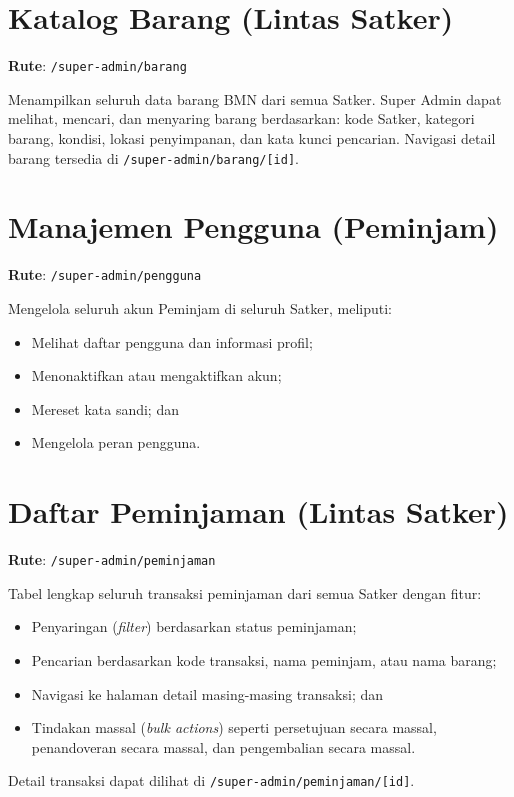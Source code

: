 \documentclass[
  12pt,
  a4paper,
  oneside,
  final
]{report}
\begin{document}
\section{Katalog Barang (Lintas Satker)}
\textbf{Rute}: \texttt{/super-admin/barang}

Menampilkan seluruh data barang BMN dari semua Satker. Super Admin
dapat melihat, mencari, dan menyaring barang berdasarkan:
kode Satker, kategori barang, kondisi, lokasi penyimpanan,
dan kata kunci pencarian. Navigasi detail barang tersedia di
\texttt{/super-admin/barang/[id]}.

\section{Manajemen Pengguna (Peminjam)}
\textbf{Rute}: \texttt{/super-admin/pengguna}

Mengelola seluruh akun Peminjam di seluruh Satker, meliputi:
\begin{itemize}
  \item Melihat daftar pengguna dan informasi profil;
  \item Menonaktifkan atau mengaktifkan akun;
  \item Mereset kata sandi; dan
  \item Mengelola peran pengguna.
\end{itemize}

\section{Daftar Peminjaman (Lintas Satker)}
\textbf{Rute}: \texttt{/super-admin/peminjaman}

Tabel lengkap seluruh transaksi peminjaman dari semua Satker
dengan fitur:
\begin{itemize}
  \item Penyaringan ({\it filter}) berdasarkan status peminjaman;
  \item Pencarian berdasarkan kode transaksi, nama peminjam,
        atau nama barang;
  \item Navigasi ke halaman detail masing-masing transaksi; dan
  \item Tindakan massal ({\it bulk actions}) seperti persetujuan
      secara massal, penandoveran secara massal, dan pengembalian secara massal.
\end{itemize}

Detail transaksi dapat dilihat di
\texttt{/super-admin/peminjaman/[id]}.
\end{document}
